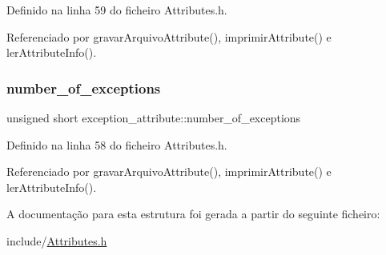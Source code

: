 Definido na linha 59 do ficheiro Attributes.\+h.



Referenciado por gravar\+Arquivo\+Attribute(), imprimir\+Attribute() e ler\+Attribute\+Info().

\mbox{\label{structexception__attribute_a40daaffb1cea794d6b65513bc7639d88}} 
\subsubsection{\texorpdfstring{number\+\_\+of\+\_\+exceptions}{number\_of\_exceptions}}
{\footnotesize\ttfamily unsigned short exception\+\_\+attribute\+::number\+\_\+of\+\_\+exceptions}



Definido na linha 58 do ficheiro Attributes.\+h.



Referenciado por gravar\+Arquivo\+Attribute(), imprimir\+Attribute() e ler\+Attribute\+Info().



A documentação para esta estrutura foi gerada a partir do seguinte ficheiro\+:\begin{DoxyCompactItemize}
\item 
include/\hyperlink{Attributes_8h}{Attributes.\+h}\end{DoxyCompactItemize}
